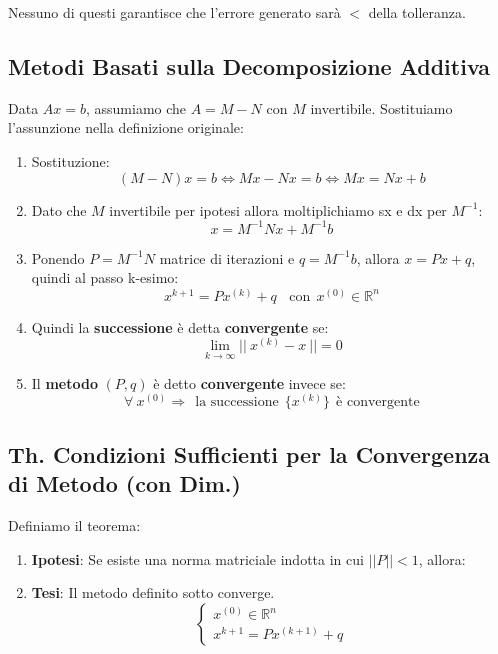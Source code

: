 \documentclass{article}
\begin{document}
Nessuno di questi garantisce che l'errore generato sarà $<$ della tolleranza.

\subsection{Metodi Basati sulla Decomposizione Additiva}

Data $Ax = b$, assumiamo che $A = M - N$ con $M$ invertibile. Sostituiamo l'assunzione nella definizione originale:

\vspace*{8px}

\begin{enumerate}
    \item Sostituzione:
    \[ (M - N)x = b \Leftrightarrow Mx - Nx = b \Leftrightarrow Mx = Nx + b  \]
    \vspace*{15px}
    \item Dato che $M$ invertibile per ipotesi allora moltiplichiamo sx e dx per $M^{-1}$:
    \[ x = M^{-1}Nx + M^{-1}b \]
    \item Ponendo $P=M^{-1}N$ matrice di iterazioni e $q = M^{-1}b$, allora $x = Px + q$, quindi al passo k-esimo:
    \vspace*{8px}
    \[ x^{k+1} = Px^{(k)} + q \:\:\:\: \text{con} \:\: x^{(0)} \in \mathbb{R}^{n} \]
    \item Quindi la \textbf{successione} è detta \textbf{convergente} se:
    \[ \lim_{k \rightarrow \infty} ||\: x^{(k)} - x \:|| = 0 \]
    \item Il \textbf{metodo} $(P,q)$ è detto \textbf{convergente} invece se: 
    \[ \forall \: x^{(0)} \Rightarrow \:\: \text{la successione} \:\: \{ x^{(k)} \} \:\: \text{è convergente}\]
\end{enumerate}

\subsection{Th. Condizioni Sufficienti per la Convergenza di Metodo (con Dim.)}

Definiamo il teorema:

\begin{enumerate}
    \item \textbf{Ipotesi}: Se esiste una norma matriciale indotta in cui $||P|| < 1$, allora:
    \item \textbf{Tesi}: Il metodo definito sotto converge.
    \vspace*{10px}
    \[ \left\{ \begin{array}{rcl}
        x^{(0)} \in \mathbb{R}^{n} \\ 
        x^{k+1} = Px^{(k+1)} + q 
        \end{array}\right.
         \]
\end{enumerate}
\end{document}
